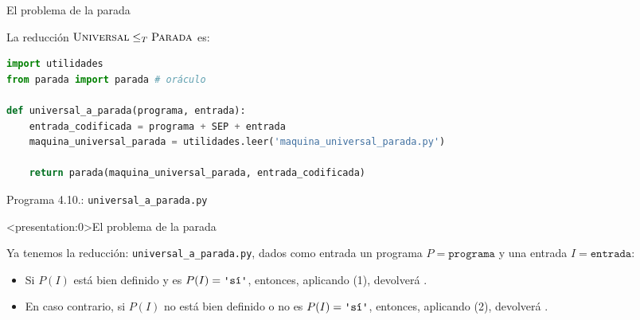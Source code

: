 \documentclass[10pt,xcolor=dvipsnames,aspectratio=169,spanish]{beamer}
\newcommand{\palabra}[1]{\texttt{\textquotesingle{}{#1}\textquotesingle{}}}
\begin{document}
\begin{frame}[fragile]{El problema de la parada}

La reducción $\textsc{Universal}\leq_T\textsc{Parada}$ es:

\begin{lstlisting}[language=Python]
import utilidades
from parada import parada # oráculo

def universal_a_parada(programa, entrada):
    entrada_codificada = programa + SEP + entrada
    maquina_universal_parada = utilidades.leer('maquina_universal_parada.py')

    return parada(maquina_universal_parada, entrada_codificada)
\end{lstlisting}
\vspace*{-4mm}
\begin{center}
{\small Programa 4.10.: \texttt{universal\_a\_parada.py}}
\end{center}

\vspace*{-8.5mm}

\hfill\square


\end{frame}


\begin{frame}<presentation:0>{El problema de la parada}

Ya tenemos la reducción: \texttt{universal\_a\_parada.py}, dados como entrada un programa $P=\texttt{programa}$ y una entrada $I=\texttt{entrada}$:

\pause

\begin{itemize}
    \item Si $P(I)$ está bien definido y es $P(I)=\palabra{sí}$, entonces, aplicando (1), devolverá \palabra{sí}.
    \item En caso contrario, si $P(I)$ no está bien definido o no es $P(I)=\palabra{sí}$, entonces, aplicando (2), devolverá \palabra{no}.\vspace{-8mm}
\end{itemize}

\hfill\square

\end{frame}
\end{document}
